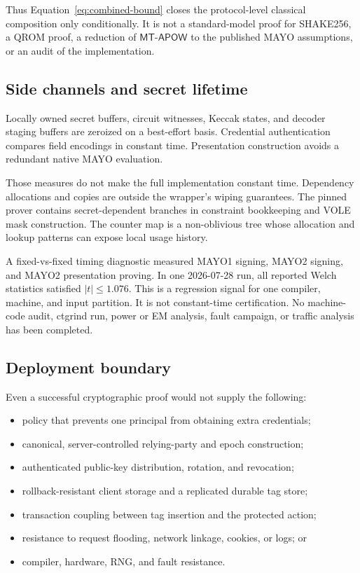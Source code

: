 \documentclass[11pt]{article}
\theoremstyle{remark}
\begin{document}
Thus Equation~\eqref{eq:combined-bound} closes the protocol-level classical
composition only conditionally. It is not a standard-model proof for SHAKE256,
a QROM proof, a reduction of $\mathsf{MT\text{-}APOW}$ to the published MAYO
assumptions, or an audit of the implementation.

\subsection{Side channels and secret lifetime}

Locally owned secret buffers, circuit witnesses, Keccak states, and decoder
staging buffers are zeroized on a best-effort basis. Credential
authentication compares field encodings in constant time. Presentation
construction avoids a redundant native MAYO evaluation.

Those measures do not make the full implementation constant time. Dependency
allocations and copies are outside the wrapper's wiping guarantees. The
pinned prover contains secret-dependent branches in constraint bookkeeping
and VOLE mask construction. The counter map is a non-oblivious tree whose
allocation and lookup patterns can expose local usage history.

\begin{minipage}{\textwidth}
A fixed-vs-fixed timing diagnostic measured MAYO1 signing, MAYO2 signing, and
MAYO2 presentation proving. In one 2026-07-28 run, all reported Welch
statistics satisfied $|t|\leq 1.076$. This is a regression signal for one
compiler, machine, and input partition. It is not constant-time
certification. No machine-code audit, ctgrind run, power or EM analysis, fault
campaign, or traffic analysis has been completed.
\end{minipage}

\subsection{Deployment boundary}

Even a successful cryptographic proof would not supply the following:
\begin{itemize}
  \item policy that prevents one principal from obtaining extra credentials;
  \item canonical, server-controlled relying-party and epoch construction;
  \item authenticated public-key distribution, rotation, and revocation;
  \item rollback-resistant client storage and a replicated durable tag store;
  \item transaction coupling between tag insertion and the protected action;
  \item resistance to request flooding, network linkage, cookies, or logs; or
  \item compiler, hardware, RNG, and fault resistance.
\end{itemize}
\end{document}

